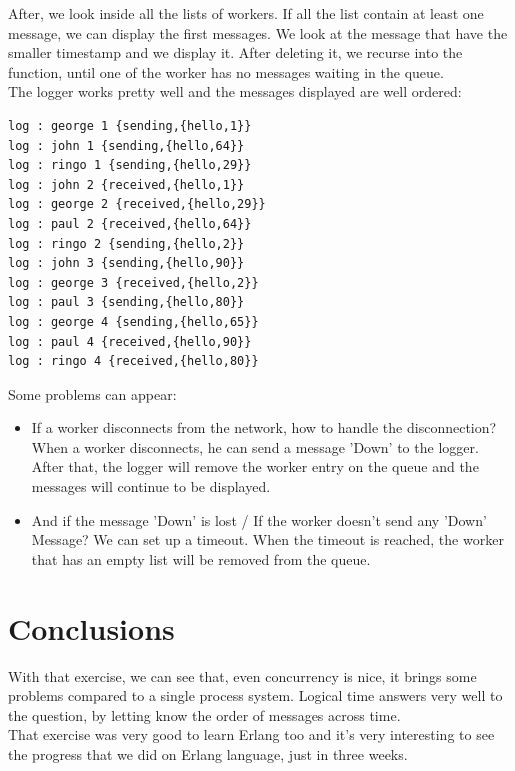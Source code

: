 \documentclass[a4paper, 11pt]{article}
\begin{document}
After, we look inside all the lists of workers. If all the list contain at least one message, we can display the first messages. We look at the message that have the smaller timestamp and we display it. After deleting it, we recurse into the function, until one of the worker has no messages waiting in the queue.\\

The logger works pretty well and the messages displayed are well ordered:

\begin{verbatim}
log : george 1 {sending,{hello,1}}
log : john 1 {sending,{hello,64}}
log : ringo 1 {sending,{hello,29}}
log : john 2 {received,{hello,1}}
log : george 2 {received,{hello,29}}
log : paul 2 {received,{hello,64}}
log : ringo 2 {sending,{hello,2}}
log : john 3 {sending,{hello,90}}
log : george 3 {received,{hello,2}}
log : paul 3 {sending,{hello,80}}
log : george 4 {sending,{hello,65}}
log : paul 4 {received,{hello,90}}
log : ringo 4 {received,{hello,80}}
\end{verbatim}

Some problems can appear:
\begin{itemize}
\item If a worker disconnects from the network, how to handle the disconnection? When a worker disconnects, he can send a message 'Down' to the logger. After that, the logger will remove the worker entry on the queue and the messages will continue to be displayed.
\item And if the message 'Down' is lost / If the worker doesn't send any 'Down' Message? We can set up a timeout. When the timeout is reached, the worker that has an empty list will be removed from the queue.
\end{itemize} 

\section{Conclusions}
With that exercise, we can see that, even concurrency is nice, it brings some problems compared to a single process system. Logical time answers very well to the question, by letting know the order of messages across time.\\

That exercise was very good to learn Erlang too and it's very interesting to see the progress that we did on Erlang language, just in three weeks.
\end{document}
